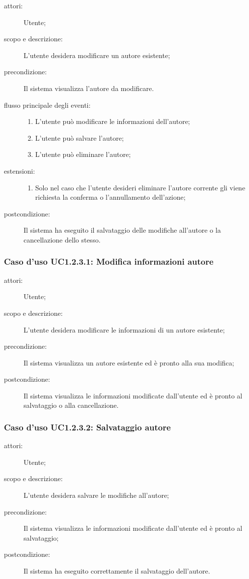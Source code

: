 \begin{description}
\item[attori:] Utente;
\item[scopo e descrizione:] L'utente desidera modificare un autore esistente;
\item[precondizione:] Il sistema visualizza l'autore da modificare.
\item[flusso principale degli eventi:] \hfill 
	\begin{enumerate}
	\item L'utente può modificare le informazioni dell'autore;
	\item L'utente può salvare l'autore;
	\item L'utente può eliminare l'autore;
	\end{enumerate}
\item[estensioni:] \hfill
	\begin{enumerate}
	\item Solo nel caso che l'utente desideri eliminare l'autore corrente gli viene richiesta la conferma o l'annullamento dell'azione;
	\end{enumerate}
\item[postcondizione:] Il sistema ha eseguito il salvataggio delle modifiche all'autore o la cancellazione dello stesso.
\end{description}

\subsubsection{Caso d'uso UC1.2.3.1: Modifica informazioni autore}
\begin{description}
\item[attori:] Utente;
\item[scopo e descrizione:] L'utente desidera modificare le informazioni di un autore esistente;
\item[precondizione:] Il sistema visualizza un autore esistente ed è pronto alla sua modifica;
\item[postcondizione:] Il sistema visualizza le informazioni modificate dall'utente ed è pronto al salvataggio o alla cancellazione.
\end{description}

\subsubsection{Caso d'uso UC1.2.3.2: Salvataggio autore}
\begin{description}
\item[attori:] Utente;
\item[scopo e descrizione:] L'utente desidera salvare le modifiche all'autore;
\item[precondizione:] Il sistema visualizza le informazioni modificate dall'utente ed è pronto al salvataggio;
\item[postcondizione:] Il sistema ha eseguito correttamente il salvataggio dell'autore.
\end{description}

